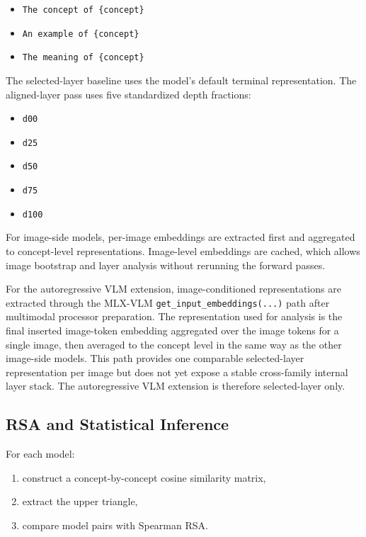 \documentclass[10pt]{article}
\providecommand{\tightlist}{%
  \setlength{\itemsep}{0pt}\setlength{\parskip}{0pt}}
\begin{document}
\begin{itemize}
\tightlist
\item
  \texttt{The\ concept\ of\ \{concept\}}
\item
  \texttt{An\ example\ of\ \{concept\}}
\item
  \texttt{The\ meaning\ of\ \{concept\}}
\end{itemize}

The selected-layer baseline uses the model's default terminal
representation. The aligned-layer pass uses five standardized depth
fractions:

\begin{itemize}
\tightlist
\item
  \texttt{d00}
\item
  \texttt{d25}
\item
  \texttt{d50}
\item
  \texttt{d75}
\item
  \texttt{d100}
\end{itemize}

For image-side models, per-image embeddings are extracted first and
aggregated to concept-level representations. Image-level embeddings are
cached, which allows image bootstrap and layer analysis without
rerunning the forward passes.

For the autoregressive VLM extension, image-conditioned representations
are extracted through the MLX-VLM \texttt{get\_input\_embeddings(...)}
path after multimodal processor preparation. The representation used for
analysis is the final inserted image-token embedding aggregated over the
image tokens for a single image, then averaged to the concept level in
the same way as the other image-side models. This path provides one
comparable selected-layer representation per image but does not yet
expose a stable cross-family internal layer stack. The autoregressive
VLM extension is therefore selected-layer only.

\subsection{RSA and Statistical
Inference}\label{rsa-and-statistical-inference}

For each model:

\begin{enumerate}
\def\labelenumi{\arabic{enumi}.}
\tightlist
\item
  construct a concept-by-concept cosine similarity matrix,
\item
  extract the upper triangle,
\item
  compare model pairs with Spearman RSA.
\end{enumerate}
\end{document}
